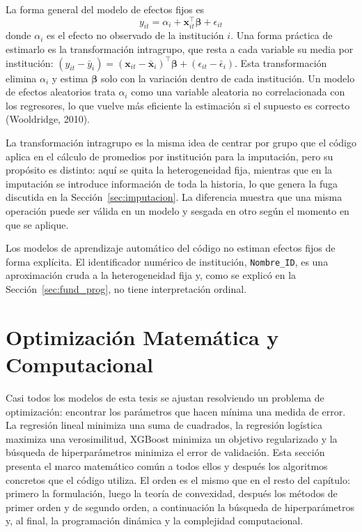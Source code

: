 La forma general del modelo de efectos fijos es
\begin{equation}
y_{it}=\alpha_i+\mathbf{x}_{it}^\top\boldsymbol{\beta}+\epsilon_{it}
\label{eq:fe_panel}
\end{equation}
donde $\alpha_i$ es el efecto no observado de la institución $i$. Una forma práctica de estimarlo es la transformación intragrupo, que resta a cada variable su media por institución: $(y_{it}-\bar{y}_i)=(\mathbf{x}_{it}-\bar{\mathbf{x}}_i)^\top\boldsymbol{\beta}+(\epsilon_{it}-\bar{\epsilon}_i)$. Esta transformación elimina $\alpha_i$ y estima $\boldsymbol{\beta}$ solo con la variación dentro de cada institución. Un modelo de efectos aleatorios trata $\alpha_i$ como una variable aleatoria no correlacionada con los regresores, lo que vuelve más eficiente la estimación si el supuesto es correcto (Wooldridge, 2010).

La transformación intragrupo es la misma idea de centrar por grupo que el código aplica en el cálculo de promedios por institución para la imputación, pero su propósito es distinto: aquí se quita la heterogeneidad fija, mientras que en la imputación se introduce información de toda la historia, lo que genera la fuga discutida en la Sección~\ref{sec:imputacion}. La diferencia muestra que una misma operación puede ser válida en un modelo y sesgada en otro según el momento en que se aplique.

Los modelos de aprendizaje automático del código no estiman efectos fijos de forma explícita. El identificador numérico de institución, \texttt{Nombre\_ID}, es una aproximación cruda a la heterogeneidad fija y, como se explicó en la Sección~\ref{sec:fund_prog}, no tiene interpretación ordinal.

\section{Optimización Matemática y Computacional}\label{sec:optimizacion}

Casi todos los modelos de esta tesis se ajustan resolviendo un problema de optimización: encontrar los parámetros que hacen mínima una medida de error. La regresión lineal minimiza una suma de cuadrados, la regresión logística maximiza una verosimilitud, XGBoost minimiza un objetivo regularizado y la búsqueda de hiperparámetros minimiza el error de validación. Esta sección presenta el marco matemático común a todos ellos y después los algoritmos concretos que el código utiliza. El orden es el mismo que en el resto del capítulo: primero la formulación, luego la teoría de convexidad, después los métodos de primer orden y de segundo orden, a continuación la búsqueda de hiperparámetros y, al final, la programación dinámica y la complejidad computacional.

